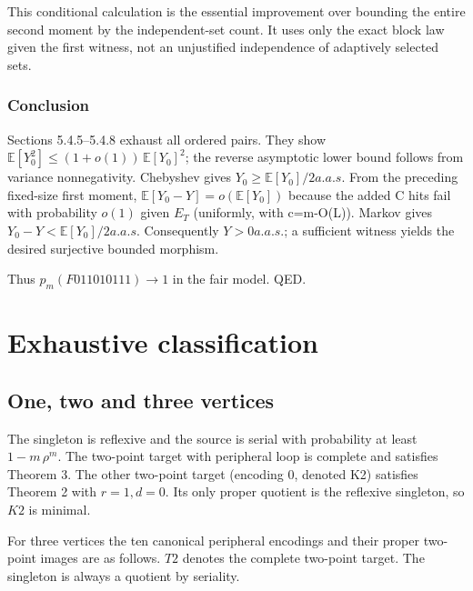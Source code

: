 \documentclass[11pt]{article}
\begin{document}
This conditional calculation is the essential improvement over bounding the entire second moment by the independent-set count. It uses only the exact block law given the first witness, not an unjustified independence of adaptively selected sets.

\subsubsection{Conclusion}

Sections 5.4.5--5.4.8 exhaust all ordered pairs. They show $\mathbb E[Y_{0}^{2}]\leq (1+o(1))\,\mathbb E[Y_{0}]^{2}$; the reverse asymptotic lower bound follows from variance nonnegativity. Chebyshev gives $Y_{0}\geq \mathbb E[Y_{0}]/2 a.a.s$. From the preceding fixed-size first moment, $\mathbb E[Y_{0}-Y]=o(\mathbb E[Y_{0}])$ because the added C hits fail with probability $o(1)$ given $E_{T}$ (uniformly, with c=m-O(L)). Markov gives $Y_{0}-Y<\mathbb E[Y_{0}]/2 a.a.s$. Consequently $Y>0 a.a.s.$; a sufficient witness yields the desired surjective bounded morphism.

Thus $p_{m}(F011010111)\to 1$ in the fair model. QED.

\section{Exhaustive classification}

\subsection{One, two and three vertices}

The singleton is reflexive and the source is serial with probability at least $1-m\,\rho ^{m}$. The two-point target with peripheral loop is complete and satisfies Theorem 3. The other two-point target (encoding 0, denoted K2) satisfies Theorem 2 with $r=1,d=0$. Its only proper quotient is the reflexive singleton, so $K2$ is minimal.

For three vertices the ten canonical peripheral encodings and their proper two-point images are as follows. $T2$ denotes the complete two-point target. The singleton is always a quotient by seriality.
\end{document}
